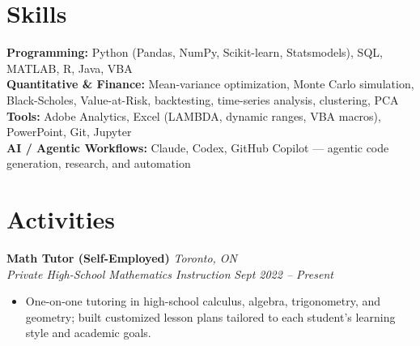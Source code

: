 \documentclass[11pt,letterpaper]{article}
\newcommand{\role}[4]{%
  \needspace{4\baselineskip}%
  \noindent\textbf{#1} \hfill \textit{#2} \\
  \textit{#3} \hfill \textit{#4} \\[-4pt]
}
\begin{document}
\section*{Skills}
\noindent\textbf{Programming:} Python (Pandas, NumPy, Scikit-learn, Statsmodels), SQL, MATLAB, R, Java, VBA \\
\textbf{Quantitative \& Finance:} Mean-variance optimization, Monte Carlo simulation, Black-Scholes, Value-at-Risk, backtesting, time-series analysis, clustering, PCA \\
\textbf{Tools:} Adobe Analytics, Excel (LAMBDA, dynamic ranges, VBA macros), PowerPoint, Git, Jupyter \\
\textbf{AI / Agentic Workflows:} Claude, Codex, GitHub Copilot --- agentic code generation, research, and automation

\section*{Activities}
\role{Math Tutor (Self-Employed)}{Toronto, ON}{Private High-School Mathematics Instruction}{Sept 2022 -- Present}
\begin{itemize}
  \item One-on-one tutoring in high-school calculus, algebra, trigonometry, and geometry; built customized lesson plans tailored to each student's learning style and academic goals.
\end{itemize}
\end{document}
